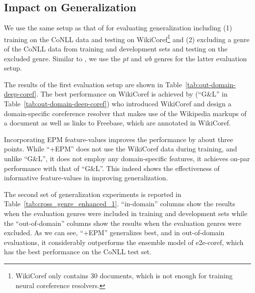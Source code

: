 \subsection{Impact on Generalization}
\label{ch:improvements:generalization}
We use the same setup as that of  for evaluating generalization 
including (1) training on the CoNLL data and testing on WikiCoref\footnote{WikiCoref only contains 30 documents, which is not enough for training neural coreference resolvers.}
and (2) excluding a genre of the CoNLL data from training and development sets 
and testing on the excluded genre. Similar to , we use the \emph{pt} and \emph{wb} genres for the latter evaluation setup.  

The results of the first evaluation setup are shown in Table~\ref{tab:out-domain-deep-coref}.
The best performance on WikiCoref is achieved by  (``G\&L'' in Table~\ref{tab:out-domain-deep-coref})
who introduced WikiCoref and design a domain-specific coreference resolver that makes use of 
the Wikipedia markups of a document as well as links to Freebase, which are annotated in WikiCoref.

Incorporating EPM feature-values improves the performance by about three points.
While ``+EPM'' does not use the WikiCoref data during training, and unlike ``G\&L'', it does not employ any domain-specific features,
it achieves on-par performance with that of ``G\&L''.
This indeed shows the effectiveness of informative feature-values in improving generalization.



The second set of generalization experiments is reported in Table~\ref{tab:cross_genre_enhanced_1}. 
``in-domain'' columns show the results when the evaluation genres were included in training and development sets 
while the ``out-of-domain'' columns show the results when the evaluation genres were excluded.
As we can see, ``+EPM'' generalizes best, and in out-of-domain evaluations, it considerably outperforms the ensemble model of e2e-coref, which has the best performance on the CoNLL test set. 